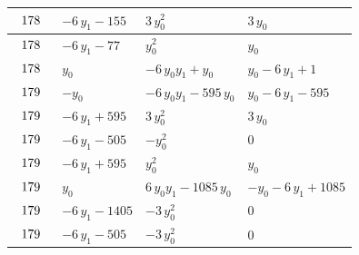 \begin{table}[H]
\begin{center}
{\begin{tabular}{|l|l|l|l|}
$\begin{tabular}{l}
178 \\
\end{tabular}$ & $ -6 \, y_{1} - 155 $ & $ 3 \, y_{0}^{2} $ & $ 3 \, y_{0} $ \\ \hline
$\begin{tabular}{l}
178 \\
\end{tabular}$ & $ -6 \, y_{1} - 77 $ & $ y_{0}^{2} $ & $ y_{0} $ \\ \hline
$\begin{tabular}{l}
178 \\
\end{tabular}$ & $ y_{0} $ & $ -6 \, y_{0} y_{1} + y_{0} $ & $ y_{0} - 6 \, y_{1} + 1 $ \\ \hline
$\begin{tabular}{l}
179 \\
\end{tabular}$ & $ -y_{0} $ & $ -6 \, y_{0} y_{1} - 595 \, y_{0} $ & $ y_{0} - 6 \, y_{1} - 595 $ \\ \hline
$\begin{tabular}{l}
179 \\
\end{tabular}$ & $ -6 \, y_{1} + 595 $ & $ 3 \, y_{0}^{2} $ & $ 3 \, y_{0} $ \\ \hline
$\begin{tabular}{l}
179 \\
\end{tabular}$ & $ -6 \, y_{1} - 505 $ & $ -y_{0}^{2} $ & $ 0 $ \\ \hline
$\begin{tabular}{l}
179 \\
\end{tabular}$ & $ -6 \, y_{1} + 595 $ & $ y_{0}^{2} $ & $ y_{0} $ \\ \hline
$\begin{tabular}{l}
179 \\
\end{tabular}$ & $ y_{0} $ & $ 6 \, y_{0} y_{1} - 1085 \, y_{0} $ & $ -y_{0} - 6 \, y_{1} + 1085 $ \\ \hline
$\begin{tabular}{l}
179 \\
\end{tabular}$ & $ -6 \, y_{1} - 1405 $ & $ -3 \, y_{0}^{2} $ & $ 0 $ \\ \hline
$\begin{tabular}{l}
179 \\
\end{tabular}$ & $ -6 \, y_{1} - 505 $ & $ -3 \, y_{0}^{2} $ & $ 0 $ \\ \hline

\end{tabular}}
\end{center}
\end{table}
